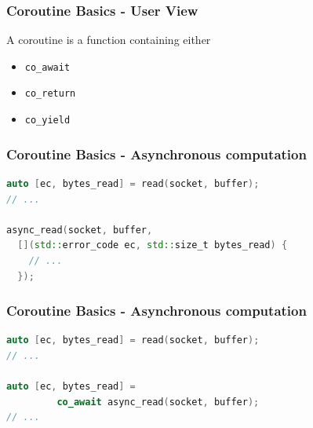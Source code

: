 \documentclass[aspectratio=169]{beamer}
\begin{document}

\begin{frame}
    \frametitle{Coroutine Basics - User View}
    
    A coroutine is a function containing either
    \begin{itemize}
    \item \texttt{co\_await}
    \item \texttt{co\_return}
    \item \texttt{co\_yield}
    \end{itemize}
\end{frame}

\begin{frame}[fragile]
  \frametitle{Coroutine Basics - Asynchronous computation}

  \begin{lstlisting}[language={C++}]
auto [ec, bytes_read] = read(socket, buffer);
// ...

async_read(socket, buffer,
  [](std::error_code ec, std::size_t bytes_read) {
    // ...
  });
  \end{lstlisting}
\end{frame}

\begin{frame}[fragile]
  \frametitle{Coroutine Basics - Asynchronous computation}

  \begin{lstlisting}[language={C++}]
auto [ec, bytes_read] = read(socket, buffer);
// ...

auto [ec, bytes_read] =
         co_await async_read(socket, buffer);
// ...
  \end{lstlisting}
\end{frame}
\end{document}
